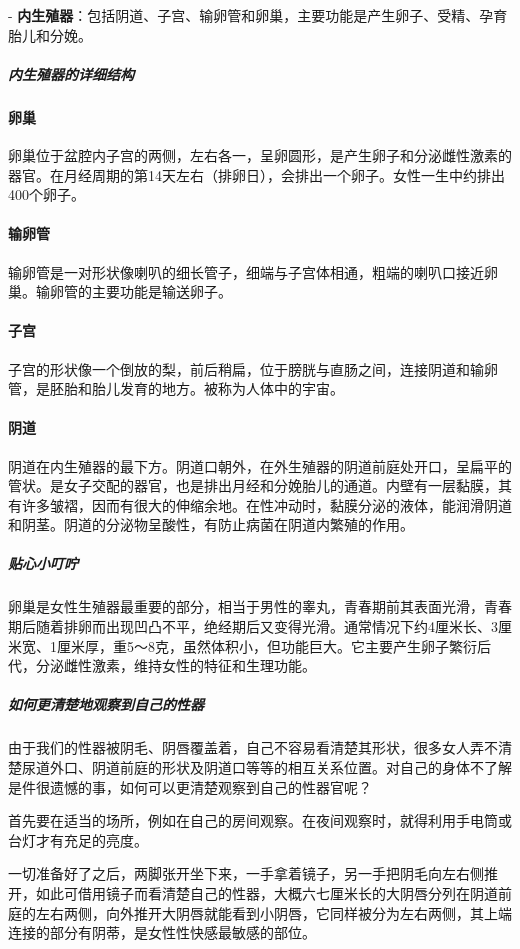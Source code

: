 \begin{enumerate}
- \textbf{内生殖器}：包括阴道、子宫、输卵管和卵巢，主要功能是产生卵子、受精、孕育胎儿和分娩。

\subparagraph{内生殖器的详细结构}

\paragraph{卵巢}
卵巢位于盆腔内子宫的两侧，左右各一，呈卵圆形，是产生卵子和分泌雌性激素的器官。在月经周期的第14天左右（排卵日），会排出一个卵子。女性一生中约排出400个卵子。

\paragraph{输卵管}
输卵管是一对形状像喇叭的细长管子，细端与子宫体相通，粗端的喇叭口接近卵巢。输卵管的主要功能是输送卵子。

\paragraph{子宫}
子宫的形状像一个倒放的梨，前后稍扁，位于膀胱与直肠之间，连接阴道和输卵管，是胚胎和胎儿发育的地方。被称为人体中的宇宙。

\paragraph{阴道}
阴道在内生殖器的最下方。阴道口朝外，在外生殖器的阴道前庭处开口，呈扁平的管状。是女子交配的器官，也是排出月经和分娩胎儿的通道。内壁有一层黏膜，其有许多皱褶，因而有很大的伸缩余地。在性冲动时，黏膜分泌的液体，能润滑阴道和阴茎。阴道的分泌物呈酸性，有防止病菌在阴道内繁殖的作用。

\subparagraph{贴心小叮咛}
卵巢是女性生殖器最重要的部分，相当于男性的睾丸，青春期前其表面光滑，青春期后随着排卵而出现凹凸不平，绝经期后又变得光滑。通常情况下约4厘米长、3厘米宽、1厘米厚，重5～8克，虽然体积小，但功能巨大。它主要产生卵子繁衍后代，分泌雌性激素，维持女性的特征和生理功能。

\subparagraph{如何更清楚地观察到自己的性器}
由于我们的性器被阴毛、阴唇覆盖着，自己不容易看清楚其形状，很多女人弄不清楚尿道外口、阴道前庭的形状及阴道口等等的相互关系位置。对自己的身体不了解是件很遗憾的事，如何可以更清楚观察到自己的性器官呢？

首先要在适当的场所，例如在自己的房间观察。在夜间观察时，就得利用手电筒或台灯才有充足的亮度。

一切准备好了之后，两脚张开坐下来，一手拿着镜子，另一手把阴毛向左右侧推开，如此可借用镜子而看清楚自己的性器，大概六七厘米长的大阴唇分列在阴道前庭的左右两侧，向外推开大阴唇就能看到小阴唇，它同样被分为左右两侧，其上端连接的部分有阴蒂，是女性性快感最敏感的部位。


\end{enumerate}
